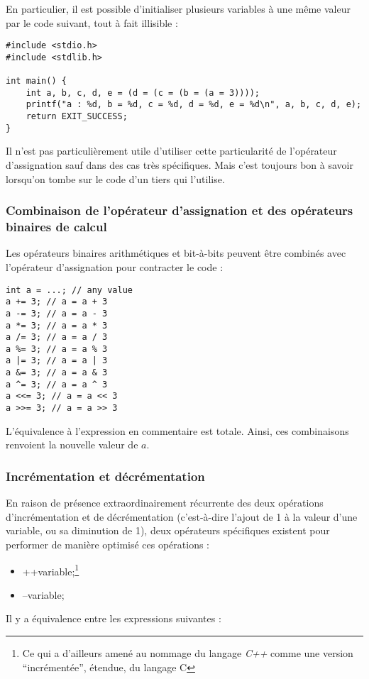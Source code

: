 \documentclass[../../../main.tex]{subfiles}
\begin{document}
En particulier, il est possible d'initialiser plusieurs variables à une même valeur par le code suivant, tout à fait illisible :
\begin{verbatim}
#include <stdio.h>
#include <stdlib.h>

int main() {
	int a, b, c, d, e = (d = (c = (b = (a = 3))));
	printf("a : %d, b = %d, c = %d, d = %d, e = %d\n", a, b, c, d, e);
	return EXIT_SUCCESS;
}
\end{verbatim}
Il n'est pas particulièrement utile d'utiliser cette particularité de l'opérateur d'assignation sauf dans des cas très spécifiques. Mais c'est toujours bon à savoir lorsqu'on tombe sur le code d'un tiers qui l'utilise.
 
\subsubsection{Combinaison de l'opérateur d'assignation et des opérateurs binaires de calcul}
 
Les opérateurs binaires arithmétiques et bit-à-bits peuvent être combinés avec l'opérateur d'assignation pour contracter le code :
\begin{verbatim}
int a = ...; // any value
a += 3; // a = a + 3
a -= 3; // a = a - 3
a *= 3; // a = a * 3
a /= 3; // a = a / 3
a %= 3; // a = a % 3
a |= 3; // a = a | 3
a &= 3; // a = a & 3
a ^= 3; // a = a ^ 3
a <<= 3; // a = a << 3
a >>= 3; // a = a >> 3
\end{verbatim}
L'équivalence à l'expression en commentaire est totale. Ainsi, ces combinaisons renvoient la nouvelle valeur de $a$.
 
\subsubsection{Incrémentation et décrémentation}
 
En raison de présence extraordinairement récurrente des deux opérations d'incrémentation et de décrémentation (c'est-à-dire l'ajout de 1 à la valeur d'une variable, ou sa diminution de 1), deux opérateurs spécifiques existent pour performer de manière optimisé ces opérations :
\begin{itemize}
	\item \textsf{++variable;}\footnote{Ce qui a d'ailleurs amené au nommage du langage \textit{C++} comme une version ``incrémentée'', étendue, du langage C}
	\item \textsf{--variable;}
\end{itemize}
Il y a équivalence entre les expressions suivantes :
 
\end{document}
